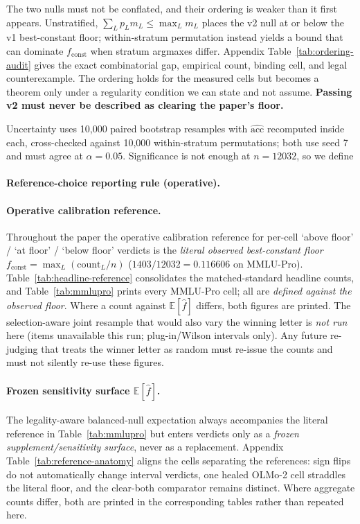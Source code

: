The two nulls must not be conflated, and their ordering is weaker than it first appears. Unstratified, $\sum_L p_{L}m_{L}\leq\max_Lm_{L}$ places the v2 null at or below the v1 best-constant floor; within-stratum permutation instead yields a bound that can dominate $f_{\mathrm{const}}$ when stratum argmaxes differ. Appendix Table~\ref{tab:ordering-audit} gives the exact combinatorial gap, empirical count, binding cell, and legal counterexample. The ordering holds for the measured cells but becomes a theorem only under a regularity condition we can state and not assume. \textbf{Passing v2 must never be described as clearing the paper's floor.}

Uncertainty uses 10,000 paired bootstrap resamples with $\widehat{\mathrm{acc}}$ recomputed inside each, cross-checked against 10,000 within-stratum permutations; both use seed 7 and must agree at $\alpha=0.05$. Significance is not enough at $n=12032$, so we define

\paragraph{Reference-choice reporting rule (operative).}
\paragraph{Operative calibration reference.} Throughout the paper the operative calibration reference for per-cell `above floor' / `at floor' / `below floor' verdicts is the \emph{literal observed best-constant floor} $f_{\mathrm{const}}=\max_L(\mathrm{count}_L/n)$ ($1403/12032=0.116606$ on MMLU-Pro). Table~\ref{tab:headline-reference} consolidates the matched-standard headline counts, and Table~\ref{tab:mmlupro} prints every MMLU-Pro cell; all are \emph{defined against the observed floor}. Where a count against $\mathbb{E}[\hat f]$ differs, both figures are printed. The selection-aware joint resample that would also vary the winning letter is \emph{not run} here (items unavailable this run; plug-in/Wilson intervals only). Any future re-judging that treats the winner letter as random must re-issue the counts and must not silently re-use these figures.

\paragraph{Frozen sensitivity surface \texorpdfstring{$\mathbb{E}[\hat f]$}{E[f-hat]}.} The legality-aware balanced-null expectation always accompanies the literal reference in Table~\ref{tab:mmlupro} but enters verdicts only as a \emph{frozen supplement/sensitivity surface}, never as a replacement. Appendix Table~\ref{tab:reference-anatomy} aligns the cells separating the references: sign flips do not automatically change interval verdicts, one healed OLMo-2 cell straddles the literal floor, and the clear-both comparator remains distinct. Where aggregate counts differ, both are printed in the corresponding tables rather than repeated here.

